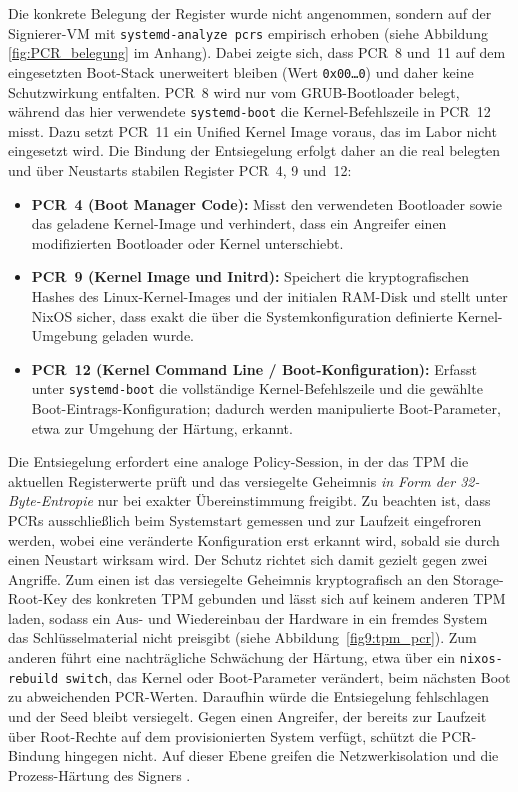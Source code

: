 Die konkrete Belegung der Register wurde nicht angenommen, sondern auf der Signierer-\ac{VM} mit \texttt{systemd-analyze pcrs} empirisch erhoben (siehe Abbildung \ref{fig:PCR_belegung} im Anhang). Dabei zeigte sich, dass \ac{PCR}~8 und~11 auf dem eingesetzten Boot-Stack unerweitert bleiben (Wert \texttt{0x00\dots{}0}) und daher keine Schutzwirkung entfalten. \ac{PCR}~8 wird nur vom GRUB-Bootloader belegt, während das hier verwendete \texttt{systemd-boot} die Kernel-Befehlszeile in \ac{PCR}~12 misst. Dazu setzt \ac{PCR}~11 ein Unified Kernel Image voraus, das im Labor nicht eingesetzt wird. Die Bindung der Entsiegelung erfolgt daher an die real belegten und über Neustarts stabilen Register \ac{PCR}~4, 9 und~12:
\begin{itemize}
    \item \textbf{\ac{PCR}~4 (Boot Manager Code):} Misst den verwendeten Bootloader sowie das geladene Kernel-Image und verhindert, dass ein Angreifer einen modifizierten Bootloader oder Kernel unterschiebt.
    \item \textbf{\ac{PCR}~9 (Kernel Image und Initrd):} Speichert die kryptografischen Hashes des Linux-Kernel-Images und der initialen RAM-Disk und stellt unter NixOS sicher, dass exakt die über die Systemkonfiguration definierte Kernel-Umgebung geladen wurde.
    \item \textbf{\ac{PCR}~12 (Kernel Command Line / Boot-Konfiguration):} Erfasst unter \texttt{systemd-boot} die vollständige Kernel-Befehlszeile und die gewählte Boot-Eintrags-Konfiguration; dadurch werden manipulierte Boot-Parameter, etwa zur Umgehung der Härtung, erkannt.
\end{itemize}

Die Entsiegelung erfordert eine analoge Policy-Session, in der das \ac{TPM} die aktuellen Registerwerte prüft und das versiegelte Geheimnis \emph{in Form der 32-Byte-Entropie} nur bei exakter Übereinstimmung freigibt. Zu beachten ist, dass \acp{PCR} ausschließlich beim Systemstart gemessen und zur Laufzeit eingefroren werden, wobei eine veränderte Konfiguration erst erkannt wird, sobald sie durch einen Neustart wirksam wird. Der Schutz richtet sich damit gezielt gegen zwei Angriffe. Zum einen ist das versiegelte Geheimnis kryptografisch an den Storage-Root-Key des konkreten \ac{TPM} gebunden und lässt sich auf keinem anderen \ac{TPM} laden, sodass ein Aus- und Wiedereinbau der Hardware in ein fremdes System das Schlüsselmaterial nicht preisgibt (siehe Abbildung~\ref{fig9:tpm_pcr}). Zum anderen führt eine nachträgliche Schwächung der Härtung, etwa über ein \texttt{nixos-rebuild switch}, das Kernel oder Boot-Parameter verändert, beim nächsten Boot zu abweichenden \ac{PCR}-Werten. Daraufhin würde die Entsiegelung fehlschlagen und der Seed bleibt versiegelt. Gegen einen Angreifer, der bereits zur Laufzeit über Root-Rechte auf dem provisionierten System verfügt, schützt die \ac{PCR}-Bindung hingegen nicht. Auf dieser Ebene greifen die Netzwerkisolation und die Prozess-Härtung des Signers \cite{TPM_PRC_NixOS, tcg_tpm2}.

